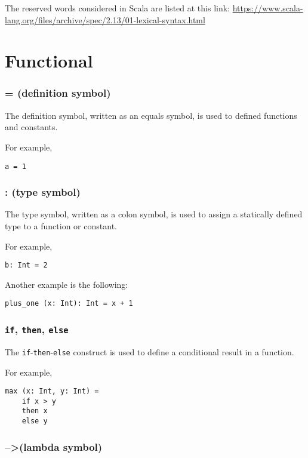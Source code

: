 \documentclass[12pt,a4paper]{book}
\newcommand{\srccode}[1]{\texttt{{#1}}}
\newcommand{\reservedWord}[1]{{\color{blue}\srccode{#1}}\xspace}
\newcommand{\slambda}{{\tiny--\textgreater}\xspace}
\newcommand{\sif}{\reservedWord{if}}
\newcommand{\sthen}{\reservedWord{then}}
\newcommand{\selse}{\reservedWord{else}}
\begin{document}
    The reserved words considered in Scala are listed at this link:
    \url{https://www.scala-lang.org/files/archive/spec/2.13/01-lexical-syntax.html}


    \section{Functional}

    \subsubsection{= (definition symbol)}

    The definition symbol, written as an equals symbol, is used to defined functions and constants.

    For example,
    \begin{lstlisting}[label={lst:exampleDef}]
  a = 1
    \end{lstlisting}

    \subsubsection{: (type symbol)}

    The type symbol, written as a colon symbol, is used to assign a statically defined type to a function or constant.

    For example,
    \begin{lstlisting}[label={lst:exampleType01}]
  b: Int = 2
    \end{lstlisting}

    Another example is the following:
    \begin{lstlisting}[label={lst:exampleType02}]
  plus_one (x: Int): Int = x + 1
    \end{lstlisting}

    \subsubsection{\sif, \sthen, \selse}

    The \sif-\sthen-\selse construct is used to define a conditional result in a function.

    For example,
    \begin{lstlisting}[label={lst:exampleIfThenElse}]
  max (x: Int, y: Int) =
    if x > y
    then x
    else y
    \end{lstlisting}

    \subsubsection{\slambda (lambda symbol)}
\end{document}
